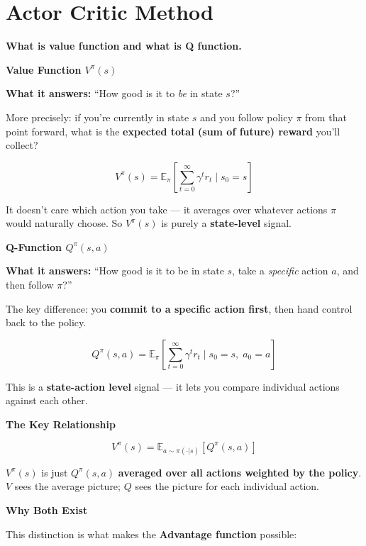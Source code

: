\section{Actor Critic Method}


\textbf{What is value function and what is Q function.}

\medskip

\textbf{Value Function $V^\pi(s)$}

\textbf{What it answers:} ``How good is it to \textit{be} in state $s$?''

More precisely: if you're currently in state $s$ and you follow policy $\pi$ from that point forward, what is the \textbf{expected total (sum of future) reward} you'll collect?

\[
V^\pi(s) = \mathbb{E}_\pi \left[ \sum_{t=0}^{\infty} \gamma^t r_t \;\bigg|\; s_0 = s \right]
\]

It doesn't care which action you take — it averages over whatever actions $\pi$ would naturally choose. So $V^\pi(s)$ is purely a \textbf{state-level} signal.

\medskip

\textbf{Q-Function $Q^\pi(s, a)$}

\textbf{What it answers:} ``How good is it to be in state $s$, take a \textit{specific} action $a$, and then follow $\pi$?''

The key difference: you \textbf{commit to a specific action first}, then hand control back to the policy.

\[
Q^\pi(s, a) = \mathbb{E}_\pi \left[ \sum_{t=0}^{\infty} \gamma^t r_t \;\bigg|\; s_0 = s,\; a_0 = a \right]
\]

This is a \textbf{state-action level} signal — it lets you compare individual actions against each other.

\medskip

\textbf{The Key Relationship}

\[
V^\pi(s) = \mathbb{E}_{a \sim \pi(\cdot|s)}\left[Q^\pi(s, a)\right]
\]

$V^\pi(s)$ is just $Q^\pi(s, a)$ \textbf{averaged over all actions weighted by the policy}. $V$ sees the average picture; $Q$ sees the picture for each individual action.

\medskip

\textbf{Why Both Exist}

This distinction is what makes the \textbf{Advantage function} possible:

